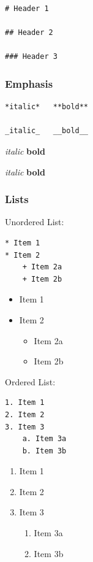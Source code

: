 \documentclass[]{book}
\providecommand{\tightlist}{%
  \setlength{\itemsep}{0pt}\setlength{\parskip}{0pt}}
\begin{document}
\begin{verbatim}
# Header 1

## Header 2

### Header 3
\end{verbatim}

\hypertarget{emphasis}{%
\subsubsection{Emphasis}\label{emphasis}}

\begin{verbatim}
*italic*   **bold**

_italic_   __bold__
\end{verbatim}

\emph{italic} \textbf{bold}

\emph{italic} \textbf{bold}

\hypertarget{lists}{%
\subsubsection{Lists}\label{lists}}

Unordered List:

\begin{verbatim}
* Item 1
* Item 2
    + Item 2a
    + Item 2b
\end{verbatim}

\begin{itemize}
\tightlist
\item
  Item 1
\item
  Item 2

  \begin{itemize}
  \tightlist
  \item
    Item 2a
  \item
    Item 2b
  \end{itemize}
\end{itemize}

Ordered List:

\begin{verbatim}
1. Item 1
2. Item 2
3. Item 3
    a. Item 3a
    b. Item 3b
\end{verbatim}

\begin{enumerate}
\def\labelenumi{\arabic{enumi}.}
\tightlist
\item
  Item 1
\item
  Item 2
\item
  Item 3

  \begin{enumerate}
  \def\labelenumii{\alph{enumii}.}
  \tightlist
  \item
    Item 3a
  \item
    Item 3b
  \end{enumerate}
\end{enumerate}
\end{document}
